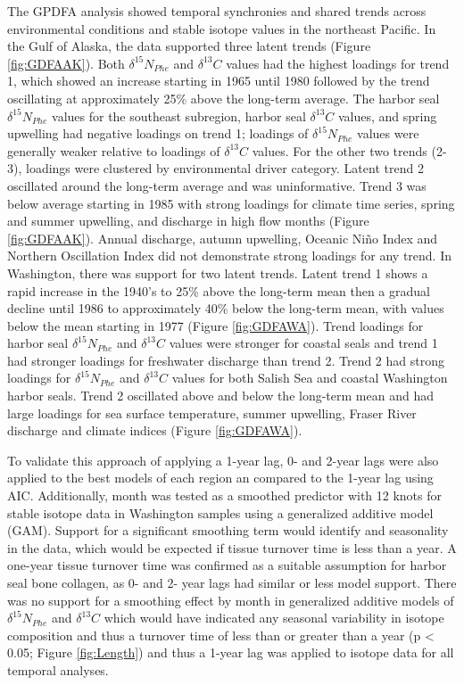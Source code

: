 \documentclass [11pt, proquest] {uwthesis}[2015/03/03]
\begin{document}
The GPDFA analysis showed temporal synchronies and shared trends across environmental conditions and stable isotope values in the northeast Pacific. In the Gulf of Alaska, the data supported three latent trends (Figure \ref{fig:GDFAAK}). Both \(\delta^{15}N_{Phe}\) and \(\delta^{13}C\) values had the highest loadings for trend 1, which showed an increase starting in 1965 until 1980 followed by the trend oscillating at approximately 25\% above the long-term average. The harbor seal \(\delta^{15}N_{Phe}\) values for the southeast subregion, harbor seal \(\delta^{13}C\) values, and spring upwelling had negative loadings on trend 1; loadings of \(\delta^{15}N_{Phe}\) values were generally weaker relative to loadings of \(\delta^{13}C\) values. For the other two trends (2-3), loadings were clustered by environmental driver category. Latent trend 2 oscillated around the long-term average and was uninformative. Trend 3 was below average starting in 1985 with strong loadings for climate time series, spring and summer upwelling, and discharge in high flow months (Figure \ref{fig:GDFAAK}). Annual discharge, autumn upwelling, Oceanic Niño Index and Northern Oscillation Index did not demonstrate strong loadings for any trend. In Washington, there was support for two latent trends. Latent trend 1 shows a rapid increase in the 1940's to 25\% above the long-term mean then a gradual decline until 1986 to approximately 40\% below the long-term mean, with values below the mean starting in 1977 (Figure \ref{fig:GDFAWA}). Trend loadings for harbor seal \(\delta^{15}N_{Phe}\) and \(\delta^{13}C\) values were stronger for coastal seals and trend 1 had stronger loadings for freshwater discharge than trend 2. Trend 2 had strong loadings for \(\delta^{15}N_{Phe}\) and \(\delta^{13}C\) values for both Salish Sea and coastal Washington harbor seals. Trend 2 oscillated above and below the long-term mean and had large loadings for sea surface temperature, summer upwelling, Fraser River discharge and climate indices (Figure \ref{fig:GDFAWA}).

To validate this approach of applying a 1-year lag, 0- and 2-year lags were also applied to the best models of each region an compared to the 1-year lag using AIC. Additionally, month was tested as a smoothed predictor with 12 knots for stable isotope data in Washington samples using a generalized additive model (GAM). Support for a significant smoothing term would identify and seasonality in the data, which would be expected if tissue turnover time is less than a year. A one-year tissue turnover time was confirmed as a suitable assumption for harbor seal bone collagen, as 0- and 2- year lags had similar or less model support. There was no support for a smoothing effect by month in generalized additive models of \(\delta^{15}N_{Phe}\) and \(\delta^{13}C\) which would have indicated any seasonal variability in isotope composition and thus a turnover time of less than or greater than a year (p \textless{} 0.05; Figure \ref{fig:Length}) and thus a 1-year lag was applied to isotope data for all temporal analyses.
\end{document}
